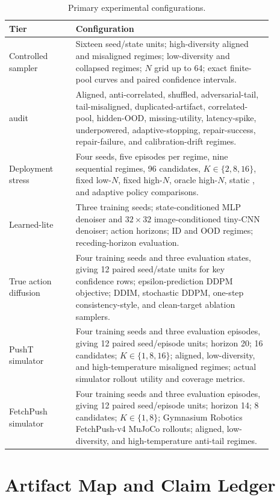 \begin{table}[H]
\caption{Primary experimental configurations.}
\label{tab:configs}
\centering
\small
\begin{tabular}{@{}p{0.22\linewidth}p{0.65\linewidth}@{}}
\toprule
Tier & Configuration \\
\midrule
Controlled sampler & Sixteen seed/state units; high-diversity aligned and misaligned regimes; low-diversity and collapsed regimes; $N$ grid up to 64; exact finite-pool curves and paired confidence intervals. \\
\ats{} audit & Aligned, anti-correlated, shuffled, adversarial-tail, tail-misaligned, duplicated-artifact, correlated-pool, hidden-OOD, missing-utility, latency-spike, underpowered, adaptive-stopping, repair-success, repair-failure, and calibration-drift regimes. \\
Deployment stress & Four seeds, five episodes per regime, nine sequential regimes, 96 candidates, $K\in\{2,8,16\}$, fixed low-$N$, fixed high-$N$, oracle high-$N$, static \ats{}, and adaptive \ats{} policy comparisons. \\
Learned-lite & Three training seeds; state-conditioned MLP denoiser and $32{\times}32$ image-conditioned tiny-CNN denoiser; action horizons; ID and OOD regimes; receding-horizon evaluation. \\
True action diffusion & Four training seeds and three evaluation states, giving 12 paired seed/state units for key confidence rows; epsilon-prediction DDPM objective; DDIM, stochastic DDPM, one-step consistency-style, and clean-target ablation samplers. \\
PushT simulator & Four training seeds and three evaluation episodes, giving 12 paired seed/episode units; horizon 20; 16 candidates; $K\in\{1,8,16\}$; aligned, low-diversity, and high-temperature misaligned regimes; actual simulator rollout utility and coverage metrics. \\
FetchPush simulator & Four training seeds and three evaluation episodes, giving 12 paired seed/episode units; horizon 14; 8 candidates; $K\in\{1,8\}$; Gymnasium Robotics FetchPush-v4 MuJoCo rollouts; aligned, low-diversity, and high-temperature anti-tail regimes. \\
\bottomrule
\end{tabular}
\end{table}

\section{Artifact Map and Claim Ledger}
\label{app:repro}

